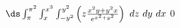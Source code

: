 {$\ds \int_{\pi}^{\pi^2}\int_{x}^{x^3}\int_{-y^2}^{y^2}\left(z\frac{x^2y+y^2x}{e^{x^2+y^2}}\right)\ dz\ dy\ dx$
}
{$0$
}
